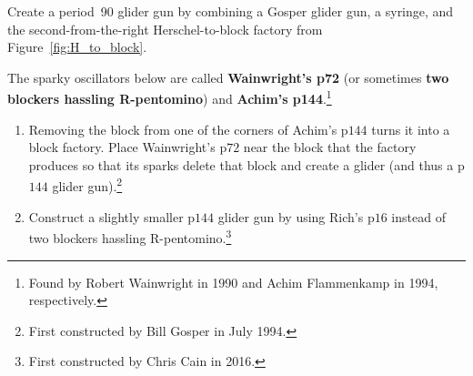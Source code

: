 \begin{multicols}{2}
	
	\mfilbreak
	
	
	\begin{problem}\label{exer:block_factory_is_tripler} 
		Create a period~90 glider gun by combining a Gosper glider gun, a syringe, and the second-from-the-right Herschel-to-block factory from Figure~\ref{fig:H_to_block}.
	\end{problem}
	
	
	\mfilbreak
	
	
	\begin{problem}\label{exer:p144_gun_from_achim} 
		The sparky oscillators below are called \textbf{Wainwright's p72} (or sometimes \textbf{two blockers hassling R-pentomino}) and \textbf{Achim's p144}.\footnote{Found by Robert Wainwright in 1990 and Achim Flammenkamp in 1994, respectively.}
		\begin{center}
			 \quad {}
		\end{center}
		
		\begin{enumerate}[label=\bf\color{ocre}(\alph*)]
			\item Removing the block from one of the corners of Achim's p$144$ turns it into a block factory. Place Wainwright's p$72$ near the block that the factory produces so that its sparks delete that block and create a glider (and thus a p$144$ glider gun).\footnote{First constructed by Bill Gosper in July 1994.}
			
			\item Construct a slightly smaller p$144$ glider gun by using Rich's p$16$ instead of two blockers hassling R-pentomino.\footnote{First constructed by Chris Cain in 2016.}
		\end{enumerate}
	\end{problem}
	

\end{multicols}
